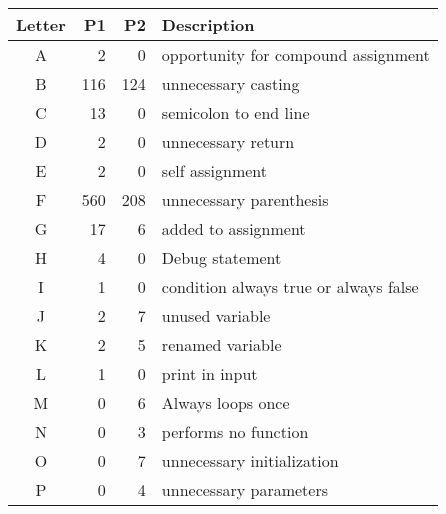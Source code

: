\vspace{2em}
\small
\begin{supertabular}{crrp{.5\textwidth}}
\label{labelsD}
Letter & P1 & P2 & Description \\ 
\toprule
A & 2 & 0 & opportunity for compound assignment \\
B & 116 & 124 & unnecessary casting \\
C & 13 & 0 & semicolon to end line \\
D & 2 & 0 & unnecessary return \\
E & 2 & 0 & self assignment \\
F & 560 & 208 & unnecessary parenthesis \\
G & 17 & 6 & added to assignment \\
H & 4 & 0 & Debug statement \\
I & 1 & 0 & condition always true or always false \\
J & 2 & 7 & unused variable \\
K & 2 & 5 & renamed variable \\
L & 1 & 0 & print in input \\
M & 0 & 6 & Always loops once \\
N & 0 & 3 & performs no function \\
O & 0 & 7 & unnecessary initialization \\
P & 0 & 4 & unnecessary parameters \\

\end{supertabular}
\vspace{2em}
